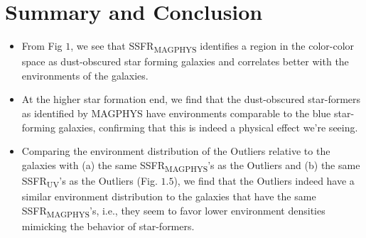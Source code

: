 \section{Summary and Conclusion}
 \begin{itemize}
 \item{From Fig $1$, we see that SSFR\textsubscript{MAGPHYS} identifies a region in the color-color space as dust-obscured star forming galaxies and correlates better with the environments of the galaxies.}
 \item{At the higher star formation end, we find that the dust-obscured star-formers as identified by MAGPHYS have environments comparable to the blue star-forming galaxies, confirming that this is indeed a physical effect we're seeing.}
 \item{Comparing the environment distribution of the Outliers relative to the galaxies with (a) the same SSFR\textsubscript{MAGPHYS}'s as the Outliers and (b) the same SSFR\textsubscript{UV}'s as the Outliers (Fig. $1.5$), we find that the Outliers indeed have a similar environment distribution to the galaxies that have the same SSFR\textsubscript{MAGPHYS}'s, i.e., they seem to favor lower environment densities mimicking the behavior of star-formers.}
 \end{itemize}
 
 
